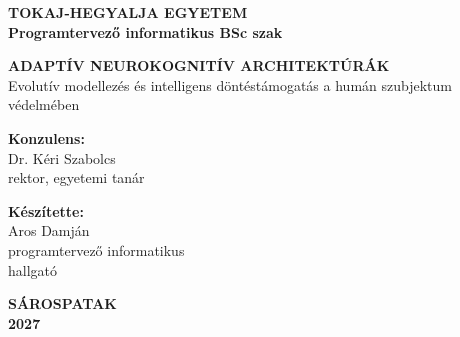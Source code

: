 \documentclass[12pt,a4paper,oneside]{book}
\begin{document}
\renewcommand{\chaptermark}[1]{\markboth{\Roman{chapter}.~#1}{}}
\renewcommand{\sectionmark}[1]{} %

\begin{titlepage}
    \centering
    
    \vspace*{1cm}
    {\large \textbf{TOKAJ-HEGYALJA EGYETEM}}\\[0.5cm]
    {\large \textbf{Programtervező informatikus BSc szak}}\\[2cm]
    
    \vspace*{3cm}
    
    {\LARGE \textbf{ADAPTÍV NEUROKOGNITÍV ARCHITEKTÚRÁK}}\\[0.5cm]
    {\large Evolutív modellezés és intelligens döntéstámogatás a humán szubjektum védelmében}\\[3cm]
    
    \vfill
    
    \begin{minipage}[t]{0.45\textwidth}
        \centering
        \textbf{Konzulens:}\\[0.2cm]
        Dr. Kéri Szabolcs\\
        rektor, egyetemi tanár
    \end{minipage}
    \hfill
    \begin{minipage}[t]{0.45\textwidth}
        \centering
        \textbf{Készítette:}\\[0.2cm]
        Aros Damján\\
        programtervező informatikus\\
        hallgató
    \end{minipage}
    
    \vspace*{2.5cm}
    {\large \textbf{SÁROSPATAK}}\\[0.3cm]
    {\large \textbf{2027}}
    
    \vspace*{0.5cm}
\end{titlepage}

\end{document}
